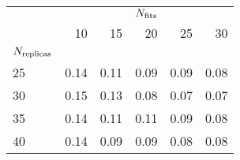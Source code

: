 \begin{center}
    \begin{tabular}{lrrrrr}
        \toprule
        {} & \multicolumn{5}{c}{$N_{\rm fits}$} \\
        {} &   10 &   15 &   20 &   25 &   30 \\
        $N_{\rm replicas}$ &      &      &      &      &      \\
        \midrule
        25            & 0.14 & 0.11 & 0.09 & 0.09 & 0.08 \\
        30            & 0.15 & 0.13 & 0.08 & 0.07 & 0.07 \\
        35            & 0.14 & 0.11 & 0.11 & 0.09 & 0.08 \\
        40            & 0.14 & 0.09 & 0.09 & 0.08 & 0.08 \\
        \bottomrule
        \end{tabular}
\end{center}